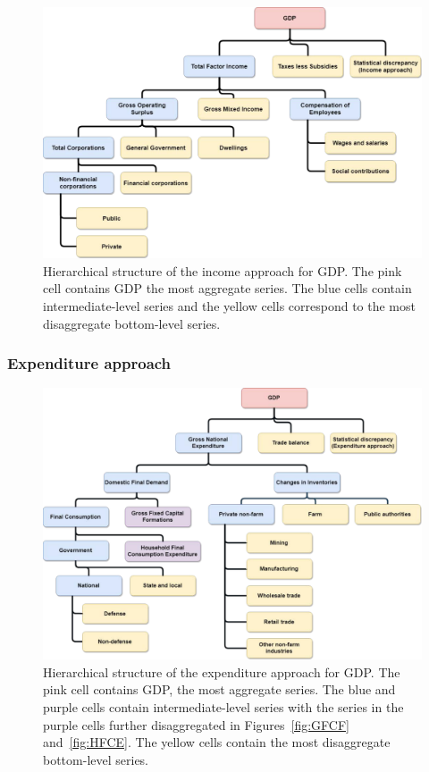 \documentclass[a4paper, 11pt]{article}
\begin{document}
\begin{figure}[!h]
	\centering
	\includegraphics[width=.9\textwidth]{Figs/Hierarchical-structures/IncomeApproach.pdf}
	\caption{Hierarchical structure of the income approach for GDP\@. The pink cell contains GDP the most aggregate series. The blue cells contain intermediate-level series and the yellow cells correspond to the most disaggregate bottom-level series.}\label{fig:GDP_I}
\end{figure}

\subsubsection*{Expenditure approach}

\begin{figure}[!t]
	\centering	\includegraphics[width=.9\textwidth]{Figs/Hierarchical-structures/ExpenditureApproach.pdf}
	\caption{Hierarchical structure of the expenditure approach for GDP\@. The pink cell contains GDP, the most aggregate series. The blue and purple cells contain intermediate-level series with the series in the purple cells further disaggregated in Figures~\ref{fig:GFCF} and~\ref{fig:HFCE}. The yellow cells contain the most disaggregate bottom-level series.}\label{fig:GDP_E}
\end{figure}
\end{document}
